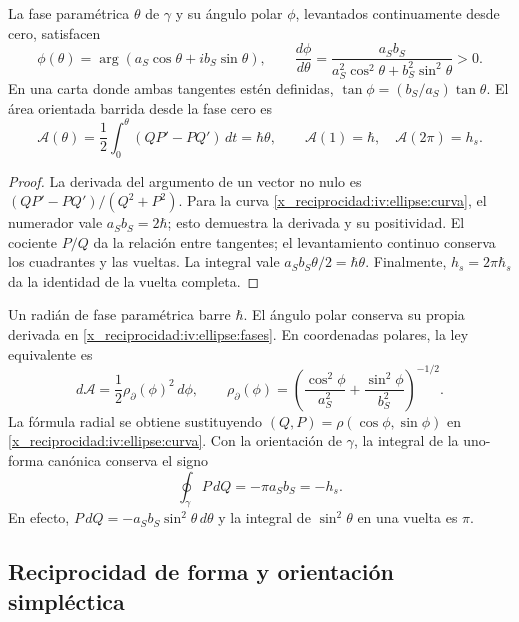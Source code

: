 \begin{proposition}
\label{x_reciprocidad:iv:ellipse:ley-areal}
La fase paramétrica \(\theta\) de \(\gamma\) y su ángulo
polar \(\phi\), levantados continuamente desde cero, satisfacen
\begin{equation}
 \phi(\theta)=\arg(a_S\cos\theta+i b_S\sin\theta),\qquad
 \frac{d\phi}{d\theta}
 =\frac{a_Sb_S}{a_S^2\cos^2\theta+b_S^2\sin^2\theta}>0.
 \label{x_reciprocidad:iv:ellipse:fases}
\end{equation}
En una carta donde ambas tangentes estén definidas,
\(\tan\phi=(b_S/a_S)\tan\theta\). El área orientada barrida
desde la fase cero es
\begin{equation}
 \mathcal A(\theta)=
 \frac12\int_0^\theta(QP'-PQ')\,dt=\hbar\theta,
 \qquad
 \mathcal A(1)=\hbar,\quad\mathcal A(2\pi)=h_s.
 \label{x_reciprocidad:iv:ellipse:area-fase}
\end{equation}
\end{proposition}
\begin{proof}
La derivada del argumento de un vector no nulo es
\((QP'-PQ')/(Q^2+P^2)\). Para la curva
\eqref{x_reciprocidad:iv:ellipse:curva}, el numerador vale
\(a_Sb_S=2\hbar\); esto demuestra la derivada y su
positividad. El cociente \(P/Q\) da la relación entre tangentes;
el levantamiento continuo conserva los cuadrantes y las vueltas.
La integral vale \(a_Sb_S\theta/2=\hbar\theta\).
Finalmente, \(h_s=2\pi\hbar_s\) da la identidad de la
vuelta completa.
\end{proof}

Un radián de fase paramétrica barre \(\hbar\). El ángulo
polar conserva su propia derivada en
\eqref{x_reciprocidad:iv:ellipse:fases}. En coordenadas polares, la ley
equivalente es
\[
 d\mathcal A=\frac12\rho_{\partial}(\phi)^2\,d\phi,\qquad
 \rho_{\partial}(\phi)=
 \left(\frac{\cos^2\phi}{a_S^2}
       +\frac{\sin^2\phi}{b_S^2}\right)^{-1/2}.
\]
La fórmula radial se obtiene sustituyendo
\((Q,P)=\rho(\cos\phi,\sin\phi)\) en
\eqref{x_reciprocidad:iv:ellipse:curva}. Con la orientación de
\(\gamma\), la integral de la uno-forma canónica conserva
el signo
\begin{equation}
 \oint_\gamma P\,dQ=-\pi a_Sb_S=-h_s.
 \label{x_reciprocidad:iv:ellipse:accion-orientada}
\end{equation}
En efecto, \(P\,dQ=-a_Sb_S\sin^2\theta\,d\theta\) y
la integral de \(\sin^2\theta\) en una vuelta es \(\pi\).

\subsection{Reciprocidad de forma y orientación simpléctica}
\label{x_reciprocidad:iv:ellipse:reciprocidad}

